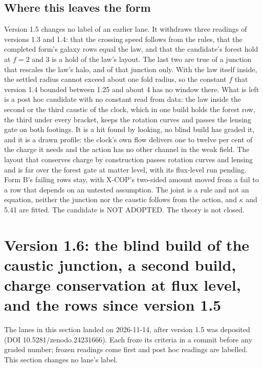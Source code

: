 \documentclass[10pt]{article}
\begin{document}
\subsection{Where this leaves the form}
Version 1.5 changes no label of an earlier lane. It withdraws three readings of versions 1.3 and 1.4: that the crossing speed follows from the rules, that the completed form's galaxy rows equal the law, and that the candidate's forest hold at $f=2$ and 3 is a hold of the law's layout. The last two are true of a junction that rescales the law's halo, and of that junction only. With the law itself inside, the settled radius cannot exceed about one fold radius, so the constant $f$ that version 1.4 bounded between 1.25 and about 4 has no window there. What is left is a post hoc candidate with no constant read from data: the law inside the second or the third caustic of the clock, which in one build holds the forest row, the third under every bracket, keeps the rotation curves and passes the lensing gate on both footings. It is a hit found by looking, no blind build has graded it, and it is a drawn profile: the clock's own flow delivers one to twelve per cent of the charge it needs and the action has no other channel in the weak field. The layout that conserves charge by construction passes rotation curves and lensing and is far over the forest gate at matter level, with its flux-level run pending. Form B's failing rows stay, with X-COP's two-sided amount moved from a fail to a row that depends on an untested assumption. The joint is a rule and not an equation, neither the junction nor the caustic follows from the action, and $\kappa$ and 5.41 are fitted. The candidate is NOT ADOPTED. The theory is not closed.

\section{Version 1.6: the blind build of the caustic junction, a second build, charge conservation at flux level, and the rows since version 1.5}
The lanes in this section landed on 2026-11-14, after version 1.5 was deposited (DOI 10.5281/zenodo.24231666). Each froze its criteria in a commit before any graded number; frozen readings come first and post hoc readings are labelled. This section changes no lane's label.
\end{document}
